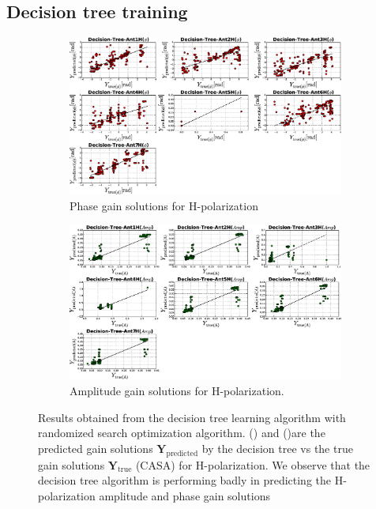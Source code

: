 \subsection{Decision tree training}
\begin{figure}[H]
   \centering
    \begin{subfigure}[t]{0.52\textheight}
        
        \includegraphics[width=\textwidth]{images/Decision-TreeHphase.eps} 
        \caption{Phase gain solutions for H-polarization}
         \label{A}
    \end{subfigure}
    
      \begin{subfigure}[t]{0.52\textheight}
       
        \includegraphics[width=\textwidth]{images/Decision-TreeHamp.eps} 
        \caption{Amplitude gain solutions for H-polarization.}
         \label{B}
    \end{subfigure}
    \caption{Results obtained from the decision tree learning algorithm with randomized search optimization algorithm. () and ()are the predicted gain solutions $\textbf{Y}_\mathrm{predicted}$ by the decision tree vs the true gain solutions $\textbf{Y}_\mathrm{true}$ (CASA) for H-polarization. We observe that the decision tree algorithm is performing badly in predicting the H-polarization amplitude and phase gain solutions}
 \label{BB}
    \end{figure}
  
